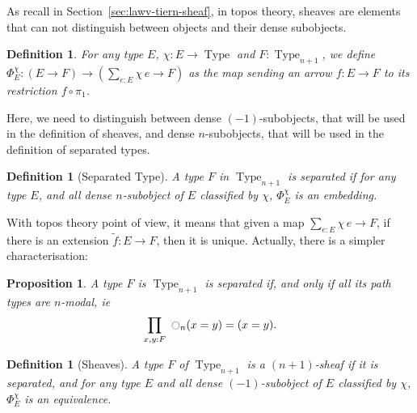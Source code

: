\documentclass[preprint,9pt,numbers]{sigplanconf}
\newtheorem{prop}[thm]{Proposition}
\newtheorem{defi}[thm]{Definition}
\DeclareMathOperator{\Type}{Type}
\newcommand{\modal}{\ensuremath{\ocircle}}
\newenvironment{mymath}[1][-0em]{%
  \newcommand\mymathaux{\vspace{#1}}%
  \vspace{#1}%
  \begin{equation*}%
  }{ %
    \mymathaux%
  \end{equation*}}
\begin{document}
As recall in Section~\ref{sec:lawv-tiern-sheaf}, in topos theory,
sheaves are elements that can not distinguish between objects and
their dense subobjects. 

\begin{defi}
  For any type $E$, $\chi : E \to \Type$ and $F:\Type_{n+1}$, we define
    $\Phi_E^\chi : (E \to F) \to (\sum_{e:E} \chi\, e \to F) $
    as the map sending an  arrow $f:E\to F$ to its restriction $f \circ \pi_1$.
\end{defi}

Here, we need to distinguish between
dense $(-1)$-sub\-objects, that will be used in the definition of
sheaves, and dense $n$-subobjects, that will be used in the definition
of separated types. 

\begin{defi}[Separated Type]
  A type $F$ in $\Type_{n+1}$ is {\em separated} if for any type $E$, and
  all dense $n$-subobject of $E$ classified by $\chi$,
  $\Phi_E^\chi$ is an embedding.%

\end{defi}

With topos theory point of view, it means that given a map $\sum_{e:E}
\chi\, e \to F$,
if there is an extension $\tilde f:E\to F$, then it is unique.
Actually, there is a simpler characterisation:

\begin{prop}
  A type $F$ is $\Type_{n+1}$ is separated if, and only if all its
  path types are $n$-modal, ie
  \begin{mymath}[-0.3em]\prod_{x,y:F}~\modal_n(x=y) = (x=y).\end{mymath}%
\end{prop}

\begin{defi}[Sheaves]
  A type $F$ of $\Type_{n+1}$ is a {\em $(n+1)$-sheaf} if it is
  separated, and for any type $E$ and all dense $(-1)$-subobject of
  $E$ classified by $\chi$, $\Phi_E^\chi$ is an
  equivalence. %

\end{defi}
\end{document}
